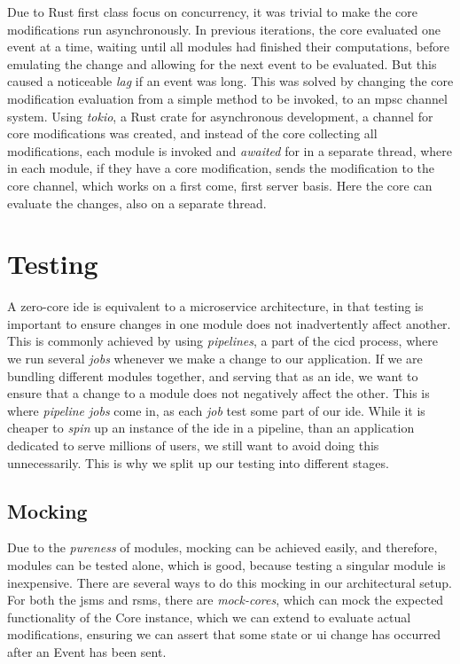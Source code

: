 Due to Rust first class focus on concurrency, it was trivial to make the core
modifications run asynchronously. In previous iterations, the core evaluated
one event at a time, waiting until all modules had finished their computations,
before emulating the change and allowing for the next event to be evaluated. But
this caused a noticeable \textit{lag} if an event was long. This was solved by
changing the core modification evaluation from a simple method to be invoked, to
an \gls{mpsc} channel system. Using \textit{tokio}, a Rust crate for
asynchronous development, a channel for core modifications was created, and
instead of the core collecting all modifications, each module is invoked and
\textit{awaited} for in a separate thread, where in each module, if they have a
core modification, sends the modification to the core channel, which works on
a first come, first server basis. Here the core can evaluate the changes, also
on a separate thread.

\section{Testing} \label{sec:testing}

A zero-core \gls{ide} is equivalent to a microservice architecture, in that
testing is important to ensure changes in one module does not inadvertently
affect another. This is commonly achieved by using \textit{pipelines}, a part
of the \gls{cicd} process, where we run several \textit{jobs} whenever we make a
change to our application. If we are bundling different modules together, and
serving that as an \gls{ide}, we want to ensure that a change to a module does
not negatively affect the other. This is where \textit{pipeline jobs} come in,
as each \textit{job} test some part of our \gls{ide}. While it is cheaper to
\textit{spin} up an instance of the \gls{ide} in a pipeline, than an application
dedicated to serve millions of users, we still want to avoid doing this
unnecessarily. This is why we split up our testing into different stages.

\subsection{Mocking}

Due to the \textit{pureness} of modules, mocking can be achieved easily, and
therefore, modules can be tested alone, which is good, because testing a
singular module is inexpensive. There are several ways to do this mocking in our
architectural setup. For both the \gls{jsms} and \gls{rsms}, there are
\textit{mock-cores}, which can mock the expected functionality of the Core
instance, which we can extend to evaluate actual modifications, ensuring we can
assert that some state or \gls{ui} change has occurred after an Event has been
sent.

